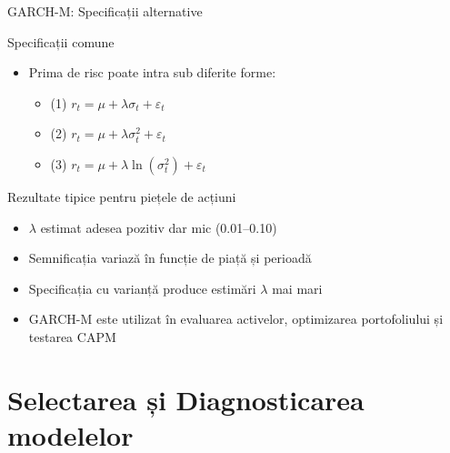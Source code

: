\documentclass[9pt, aspectratio=169, t]{beamer}
\begin{document}
\begin{frame}{GARCH-M: Specificații alternative}
    \small
    \begin{block}{Specificații comune}
        \begin{itemize}
            \item Prima de risc poate intra sub diferite forme:
            \begin{itemize}
                \item (1) $r_t = \mu + \lambda \sigma_t + \varepsilon_t$
                \item (2) $r_t = \mu + \lambda \sigma_t^2 + \varepsilon_t$
                \item (3) $r_t = \mu + \lambda \ln(\sigma_t^2) + \varepsilon_t$
            \end{itemize}
        \end{itemize}
    \end{block}
    \vspace{-0.1cm}
    \begin{exampleblock}{Rezultate tipice pentru piețele de acțiuni}
        \begin{itemize}
            \item $\lambda$ estimat adesea pozitiv dar mic (0.01--0.10)
            \item Semnificația variază în funcție de piață și perioadă
            \item Specificația cu varianță produce estimări $\lambda$ mai mari
        \end{itemize}
    \end{exampleblock}
    \vspace{-0.1cm}
    \begin{rmk}
        \begin{itemize}
            \item GARCH-M este utilizat în evaluarea activelor, optimizarea portofoliului și testarea CAPM
        \end{itemize}
    \end{rmk}
\end{frame}

\section{Selectarea și Diagnosticarea modelelor}
\end{document}
